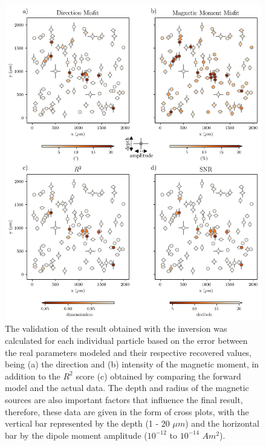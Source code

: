 \begin{figure}[tb!]
\centering
\includegraphics[width=0.75\linewidth]{figures/complex-synthetic-comparison.png}
\caption{
The validation of the result obtained with the inversion was calculated for each individual particle based on the error between the real parameters modeled and their respective recovered values, being (a) the direction and (b) intensity of the magnetic moment, in addition to the $R^2$ score (c) obtained by comparing the forward model and the actual data. The depth and radius of the magnetic sources are also important factors that influence the final result, therefore, these data are given in the form of cross plots, with the vertical bar represented by the depth (1 - 20 $\mu m$) and the horizontal bar by the dipole moment amplitude ($10^{-12}$ to $10^{-14}$ $Am^2$).
}
\label{complex-synthetic-comparison}
\end{figure}

